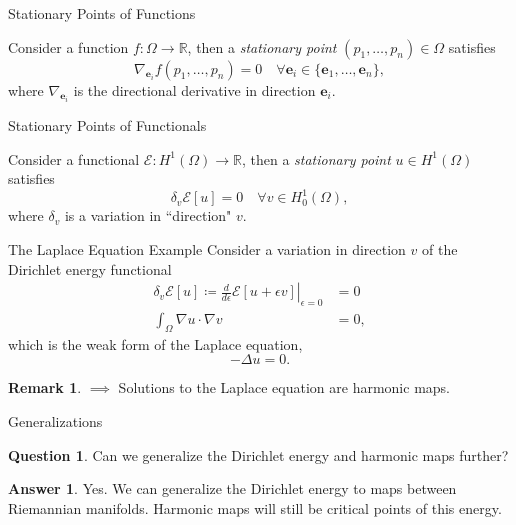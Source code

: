 \documentclass[usenames,dvipsnames]{beamer}
\theoremstyle{definition}
\newtheorem*{remark}{Remark}
\newtheorem*{question}{Question}
\newtheorem*{answer}{Answer}
\theoremstyle{theorem}
\newcommand{\R}{\mathbb{R}}
\begin{document}
        \begin{frame}{Stationary Points of Functions}
            \begin{definition}
            Consider a function $f\colon \Omega \to \R$, then a \emph{stationary point} $(p_1,\dots,p_n)\in \Omega$ satisfies
            \[  
            \nabla_{\mathbf{e}_i} f(p_1,\dots,p_n) = 0 \quad \forall \mathbf{e}_i \in     \{\mathbf{e}_1,\dots,\mathbf{e}_n\},
            \]
            where $\nabla_{\mathbf{e}_i}$ is the directional derivative in direction $\mathbf{e}_i$.
            \end{definition}
        \end{frame}

        \begin{frame}{Stationary Points of Functionals}
            \begin{definition}
            Consider a functional $\mathcal{E}\colon H^1(\Omega) \to \R$, then a \emph{stationary point} $u\in H^1(\Omega)$ satisfies
            \[  
            \delta_v \mathcal{E}[u]=0\quad \forall v \in H^1_0(\Omega),
            \]
            where $\delta_v$ is a variation in ``direction" $v$.
            \end{definition}
        \end{frame}
        
        \begin{frame}{The Laplace Equation Example}
            Consider a variation in direction $v$ of the Dirichlet energy functional
            \begin{align*}
            \delta_v \mathcal{E}[u] \coloneqq \left.\frac{d}{d\epsilon} \mathcal{E}[u+\epsilon v]\right|_{\epsilon=0}&=0 \\
            \int_\Omega \nabla u \cdot \nabla v&= 0,
            \end{align*}
            which is the weak form of the Laplace equation,
            \[
            -\Delta u = 0.
            \]
            \pause
            \begin{remark}
            $\implies$ Solutions to the Laplace equation are harmonic maps.
            \end{remark}
        \end{frame}
        
        \begin{frame}{Generalizations}
            \begin{question}
            Can we generalize the Dirichlet energy and harmonic maps further?
            \end{question}
            \pause
            \begin{answer}
            Yes.  We can generalize the Dirichlet energy to maps between Riemannian manifolds.  Harmonic maps will still be critical points of this energy.
            \end{answer}
        \end{frame}
        
\end{document}
